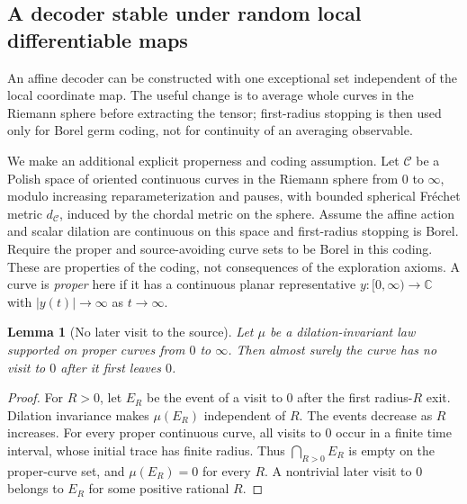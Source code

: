 \documentclass[11pt]{article}
\newtheorem{lemma}[theorem]{Lemma}
\theoremstyle{definition}\newtheorem{definition}[theorem]{Definition}
\theoremstyle{remark}\newtheorem{remark}[theorem]{Remark}
\begin{document}
\subsection{A decoder stable under random local differentiable maps}
\label{sec:wp-robust-decoder}

An affine decoder can be constructed with one exceptional set
independent of the local coordinate map.  The useful change is to
average whole curves in the Riemann sphere before extracting the tensor;
first-radius stopping is then used only for Borel germ coding, not for
continuity of an averaging observable.

We make an additional explicit properness and coding assumption.
Let $\mathcal C$ be a Polish space of oriented continuous curves in the
Riemann sphere from $0$ to $\infty$, modulo increasing reparameterization
and pauses, with bounded spherical Fr\'echet metric $d_{\mathcal C}$,
induced by the chordal metric on the sphere.
Assume the affine action and scalar dilation are continuous on this
space and first-radius stopping is Borel.  Require the proper and
source-avoiding curve sets to be Borel in this coding.  These are properties of the
coding, not consequences of the exploration axioms.  A curve is
\emph{proper} here if it has a continuous planar representative
$y:[0,\infty)\to\mathbb C$ with $|y(t)|\to\infty$ as $t\to\infty$.

\begin{lemma}[No later visit to the source]
\label{lem:wp-no-source-return}
Let $\mu$ be a dilation-invariant law supported on proper curves from
$0$ to $\infty$.  Then almost surely the curve has no visit to $0$
after it first leaves $0$.
\end{lemma}
\begin{proof}
For $R>0$, let $E_R$ be the event of a visit to $0$ after the first
radius-$R$ exit.  Dilation invariance makes $\mu(E_R)$ independent of
$R$.  The events decrease as $R$ increases.  For every proper continuous
curve, all visits to $0$ occur in a finite time interval, whose initial
trace has finite radius.  Thus $\bigcap_{R>0}E_R$ is empty on the
proper-curve set, and $\mu(E_R)=0$ for every $R$.  A nontrivial later
visit to $0$ belongs to $E_R$ for some positive rational $R$.
\end{proof}
\end{document}
